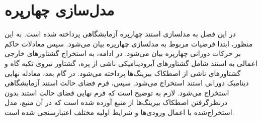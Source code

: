 \chapter{مدل‌سازی چهارپره}
 در این فصل به مدلسازی استند چهارپره آزمایشگاهی  پرداخته شده است. به این منظور، ابتدا فرضیات مربوط به 
 مدلسازی چهارپره بیان می‌شود. سپس معادلات حاکم بر حرکات 
 دورانی چهارپره بیان می‌شود. در ادامه، به استخراج گشتاورهای خارجی اعمالی 
 به استند شامل گشتاورهای آیرودینامیکی ناشی از پره، گشتاور نیروی تکیه گاه و گشتاورهای ناشی از 
 اصطکاک بیرینگ‌ها پرداخته می‌شود. در گام بعد، معادله نهایی دینامیک دورانی استند 
 استخراج می‌شود. سپس، فرم فضای حالت استند آزمایشگاهی استخراج می‌شود. لازم به 
 توضیح است که فرم نهایی فضای حالت استند بدون درنظرگرفتن اصطکاک بیرینگ‌ها از منبع
 \cite{Abeshtan}
 آورده ‌شده ‌است که در آن منبع، مدل استخراج‌شده با اعمال ورودی‌ها و شرایط اولیه مختلف 
 اعتبارسنجی شده ‌است.